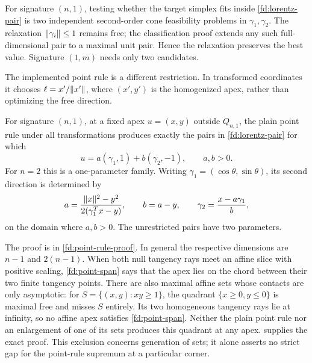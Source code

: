 For signature $(n,1)$, testing whether the target simplex fits inside
\cref{fd:lorentz-pair} is two independent second-order cone feasibility
problems in $\gamma_1,\gamma_2$. The relaxation
$\lVert\gamma_i\rVert\le1$ remains free; the classification proof extends any
such full-dimensional pair to a maximal unit pair. Hence the relaxation
preserves the best value. Signature $(1,m)$ needs only two candidates.

The implemented point rule is a different restriction. In transformed
coordinates it chooses $\ell=x'/\lVert x'\rVert$, where $(x',y')$ is the
homogenized apex, rather than optimizing the free direction.
\begin{proposition}\label{fd:point-rule}
For signature $(n,1)$, at a fixed apex $u=(x,y)$ outside $Q_{n,1}$,
the plain point rule under all transformations produces exactly the
pairs in \cref{fd:lorentz-pair} for which
\begin{equation}\label{fd:point-span}
 u=a(\gamma_1,1)+b(\gamma_2,-1),\qquad a,b>0.
\end{equation}
For $n=2$ this is a one-parameter family. Writing
$\gamma_1=(\cos\theta,\sin\theta)$, its second direction is determined by
\[
 a=\frac{\lVert x\rVert^2-y^2}{2(\gamma_1^Tx-y)},\qquad
 b=a-y,\qquad \gamma_2=\frac{x-a\gamma_1}{b},
\]
on the domain where $a,b>0$. The unrestricted pairs have two parameters.
\end{proposition}
The proof is in \cref{fd:point-rule-proof}. In general the respective
dimensions are $n-1$ and $2(n-1)$. When both null tangency rays meet an
affine slice with positive scaling, \cref{fd:point-span} says that the
apex lies on the chord between their two finite tangency points.
There are also maximal affine sets whose contacts are only asymptotic:
for $S=\{(x,y):xy\ge1\}$, the quadrant $\{x\ge0,y\le0\}$ is maximal
free and misses $S$ entirely. Its two homogeneous tangency rays lie at
infinity, so no affine apex satisfies \cref{fd:point-span}. Neither the
plain point rule nor an enlargement of one of its sets produces this
quadrant at any apex.  supplies the exact proof.
This exclusion concerns generation of sets; it alone asserts no strict
gap for the point-rule supremum at a particular corner.

